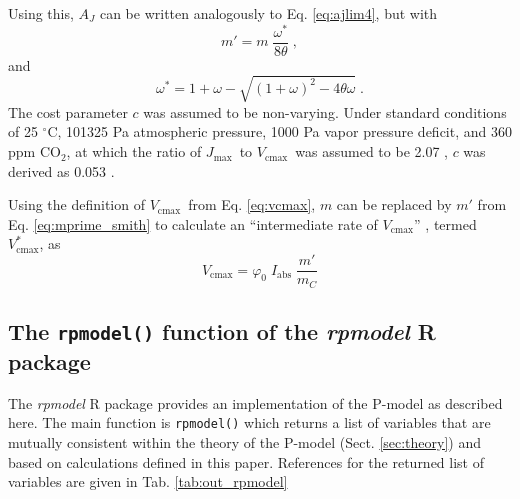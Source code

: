 \documentclass{myreport}
\newcommand{\coo}{CO$_2$}
\newcommand{\vcmax}{$V_{\text{cmax}}$}
\newcommand{\jmax}{$J_{\text{max}}$}
\begin{document}
Using this, $A_J$ can be written analogously to Eq. \ref{eq:ajlim4}, but with 
\begin{equation}
\label{eq:mprime_smith}
    m' = m \; \frac{\omega^{\ast}}{8 \theta} \;,
\end{equation}
and 
\begin{equation}
    \omega^{\ast} = 1 + \omega - \sqrt{\left(1 + \omega \right)^2 -
    4  \theta \omega} \;.
\end{equation}
The cost parameter $c$ was assumed to be non-varying. Under
standard conditions of 25 $^{\circ}$C, 101325 Pa atmospheric pressure, 1000 Pa vapor pressure deficit, and 360 ppm \coo , at which the ratio of \jmax\ to \vcmax\ was assumed to be 2.07  \citep{smithdukes17}, $c$ was derived as 0.053 \citep{smith19ecollett}.

Using the definition of \vcmax\ from Eq. \ref{eq:vcmax}, $m$ can be replaced by $m'$ from Eq. \ref{eq:mprime_smith} to calculate an ``intermediate rate of \vcmax'' \citep{smith19ecollett}, termed $V_\text{cmax}^\ast$, as
\begin{equation}
    V_\text{cmax} = \varphi_0 \; I_{\mathrm{abs}} \; \frac{m'}{m_C}
\end{equation}

\subsection{The \texttt{rpmodel()} function of the \textit{rpmodel} R package}

The \textit{rpmodel} R package provides an implementation of the P-model as described here. The main function is \texttt{rpmodel()} which returns a list of variables that are mutually consistent within the theory of the P-model (Sect. \ref{sec:theory}) and based on calculations defined in this paper. References for the returned list of variables are given in Tab. \ref{tab:out_rpmodel}
\end{document}
